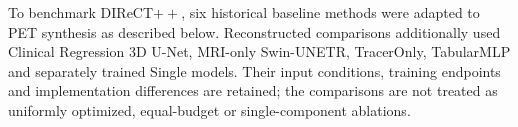 To benchmark DIReCT$++$, six historical baseline methods were adapted to PET synthesis as described below. Reconstructed comparisons additionally used Clinical Regression 3D U-Net, MRI-only Swin-UNETR, TracerOnly, TabularMLP and separately trained Single models. Their input conditions, training endpoints and implementation differences are retained; the comparisons are not treated as uniformly optimized, equal-budget or single-component ablations.
